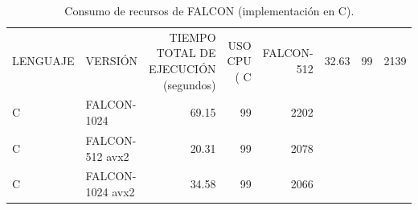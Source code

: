 \begin{table}
\centering
\caption{Consumo de recursos de FALCON (implementación en C).}
\label{tab:falcon_c_recursos}
\begin{tabular}{llrrr}
\toprule
LENGUAJE &          VERSIÓN &  TIEMPO TOTAL DE EJECUCIÓN (segundos) &  USO CPU (%
\midrule
       C &       FALCON-512 &                                 32.63 &           99 &                                   2139 \\
       C &      FALCON-1024 &                                 69.15 &           99 &                                   2202 \\
       C &  FALCON-512 avx2 &                                 20.31 &           99 &                                   2078 \\
       C & FALCON-1024 avx2 &                                 34.58 &           99 &                                   2066 \\
\bottomrule
\end{tabular}
\end{table}
